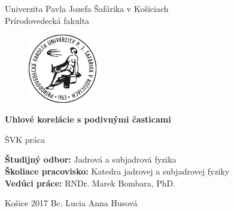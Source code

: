 \documentclass[thesismargins, thesislinespacing]{rnthesis}
\title{}
\author{Lucia Anna Husová}
\begin{document}
\begin{center}
	{\Large Univerzita Pavla Jozefa Šafárika v Košiciach} \\
	{\Large Prírodovedecká fakulta} 
\end{center}

\vspace*{2cm}

\begin{figure}[htbp!]
	\begin{center}
		\includegraphics[width=3cm]{./Obrazky_praca/logo-pf-upjs-cb.jpg}
	\end{center}
\end{figure}

\vspace*{2cm}

\begin{center}
	{\LARGE\bf Uhlové korelácie s podivnými časticami}
\end{center}

\begin{center}
	{\large ŠVK práca}
\end{center}

\vspace*{5cm}
\begin{flushleft}
{\bf Študijný odbor:}{ Jadrová a subjadrová fyzika} \\
{\bf Školiace pracovisko: }{Katedra jadrovej a subjadrovej fyziky}\\
{\bf Vedúci práce: }{ RNDr. Marek Bombara, PhD.}\\
\end{flushleft}
 
 \vspace*{2cm}
 \begin{flushleft}
{\large Košice 2017}
\hspace*{5cm}
{\large Bc. Lucia Anna Husová}
\end{flushleft}

\thispagestyle{empty}
\newpage

\maketitle
\newpage
\tableofcontents
\newpage
\end{document}
